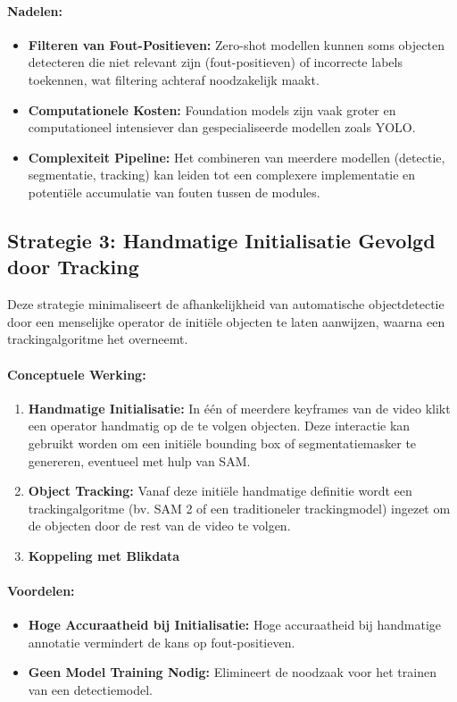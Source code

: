 \paragraph{Nadelen:}
\begin{itemize}
    \item \textbf{Filteren van Fout-Positieven:} Zero-shot modellen kunnen soms objecten detecteren die niet relevant zijn (fout-positieven) of incorrecte labels toekennen, wat filtering achteraf noodzakelijk maakt.
    \item \textbf{Computationele Kosten:} Foundation models zijn vaak groter en computationeel intensiever dan gespecialiseerde modellen zoals YOLO.
    \item \textbf{Complexiteit Pipeline:} Het combineren van meerdere modellen (detectie, segmentatie, tracking) kan leiden tot een complexere implementatie en potentiële accumulatie van fouten tussen de modules.
\end{itemize}

\subsection{Strategie 3: Handmatige Initialisatie Gevolgd door Tracking}

Deze strategie minimaliseert de afhankelijkheid van automatische objectdetectie door een menselijke operator de initiële objecten te laten aanwijzen, waarna een trackingalgoritme het overneemt.

\paragraph{Conceptuele Werking:}
\begin{enumerate}
    \item \textbf{Handmatige Initialisatie:} In één of meerdere keyframes van de video klikt een operator handmatig op de te volgen objecten. Deze interactie kan gebruikt worden om een initiële bounding box of segmentatiemasker te genereren, eventueel met hulp van SAM.
    \item \textbf{Object Tracking:} Vanaf deze initiële handmatige definitie wordt een trackingalgoritme (bv. SAM 2 of een traditioneler trackingmodel) ingezet om de objecten door de rest van de video te volgen.
    \item \textbf{Koppeling met Blikdata}
\end{enumerate}

\paragraph{Voordelen:}
\begin{itemize}
    \item \textbf{Hoge Accuraatheid bij Initialisatie:} Hoge accuraatheid bij handmatige annotatie vermindert de kans op fout-positieven.
    \item \textbf{Geen Model Training Nodig:} Elimineert de noodzaak voor het trainen van een detectiemodel.
\end{itemize}


